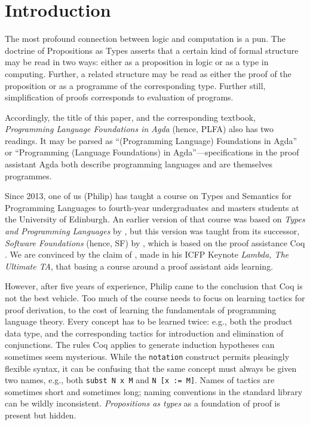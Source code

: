 \documentclass[preprint,authoryear]{elsarticle}
\begin{document}
\maketitle

\section{Introduction}

The most profound connection between logic and computation is a pun.
The doctrine of Propositions as Types asserts that a certain kind of formal
structure may be read in two ways: either as a proposition in logic or
as a type in computing.  Further, a related structure may be read as
either the proof of the proposition or as a programme of the
corresponding type.  Further still, simplification of proofs
corresponds to evaluation of programs.

Accordingly, the title of this paper, and the corresponding textbook,
\emph{Programming Language Foundations in Agda} (hence, PLFA)
also has two readings.  It may be parsed as ``(Programming Language)
Foundations in Agda'' or ``Programming (Language Foundations) in
Agda''---specifications in the proof assistant Agda both describe
programming languages and are themselves programmes.

Since 2013, one of us (Philip) has taught a course on Types and Semantics for
Programming Languages to fourth-year undergraduates and masters
students at the University of Edinburgh.  An earlier version of that
course was based on \emph{Types and Programming Languages} by
\citet{Pierce-2002}, but this version was taught from its successor,
\emph{Software Foundations} (hence, SF) by \citet{Pierce-et-al-2010},
which is based on the proof assistance Coq \citep{Huet-et-al-1997}.
We are convinced by the claim of \citet{Pierce-2009}, made in his ICFP
Keynote \emph{Lambda, The Ultimate TA}, that basing a course around a
proof assistant aids learning.

However, after five years of experience, Philip came to the conclusion
that Coq is not the best vehicle.  Too much of the course needs to
focus on learning tactics for proof derivation, to the cost of
learning the fundamentals of programming language theory.  Every
concept has to be learned twice: e.g., both the product data type, and
the corresponding tactics for introduction and elimination of
conjunctions.  The rules Coq applies to generate induction hypotheses
can sometimes seem mysterious.  While the \texttt{notation} construct
permits pleasingly flexible syntax, it can be confusing that the same
concept must always be given two names, e.g., both
\texttt{subst~N~x~M} and \texttt{N~[x~:=~M]}.  Names of tactics are
sometimes short and sometimes long; naming conventions in the standard
library can be wildly inconsistent.  \emph{Propositions as types} as a
foundation of proof is present but hidden.
\end{document}
